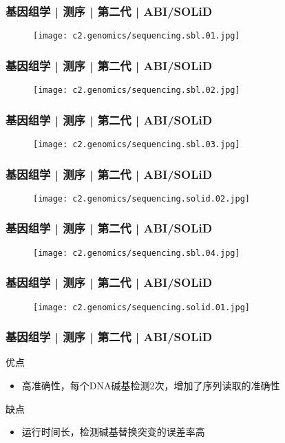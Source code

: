 \begin{frame}
  \frametitle{基因组学 | 测序 | 第二代 | ABI/SOLiD}
  \begin{figure}
    \centering
    \texttt{[image: c2.genomics/sequencing.sbl.01.jpg]}
  \end{figure}
\end{frame}

\begin{frame}
  \frametitle{基因组学 | 测序 | 第二代 | ABI/SOLiD}
  \begin{figure}
    \centering
    \texttt{[image: c2.genomics/sequencing.sbl.02.jpg]}
  \end{figure}
\end{frame}

\begin{frame}
  \frametitle{基因组学 | 测序 | 第二代 | ABI/SOLiD}
  \begin{figure}
    \centering
    \texttt{[image: c2.genomics/sequencing.sbl.03.jpg]}
  \end{figure}
\end{frame}

\begin{frame}
  \frametitle{基因组学 | 测序 | 第二代 | ABI/SOLiD}
  \begin{figure}
    \centering
    \texttt{[image: c2.genomics/sequencing.solid.02.jpg]}
  \end{figure}
\end{frame}

\begin{frame}
  \frametitle{基因组学 | 测序 | 第二代 | ABI/SOLiD}
  \begin{figure}
    \centering
    \texttt{[image: c2.genomics/sequencing.sbl.04.jpg]}
  \end{figure}
\end{frame}

\begin{frame}
  \frametitle{基因组学 | 测序 | 第二代 | ABI/SOLiD}
  \begin{figure}
    \centering
    \texttt{[image: c2.genomics/sequencing.solid.01.jpg]}
  \end{figure}
\end{frame}

\begin{frame}
  \frametitle{基因组学 | 测序 | 第二代 | ABI/SOLiD}
  \begin{block}{优点}
    \begin{itemize}
      \item 高准确性，每个DNA碱基检测2次，增加了序列读取的准确性
    \end{itemize}
  \end{block}
  \pause
  \begin{block}{缺点}
    \begin{itemize}
      \item 运行时间长，检测碱基替换突变的误差率高
    \end{itemize}
  \end{block}
\end{frame}

